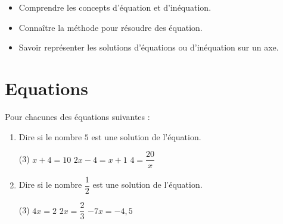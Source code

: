 \documentclass[10pt,a4paper]{article}
\begin{document}


\vspace{-0.3cm}

\begin{objectifs}
\begin{itemize}
    \item Comprendre les concepts d'équation et d'inéquation.
    \item Connaître la méthode pour résoudre des équation.
    \item Savoir représenter les solutions d'équations ou d'inéquation sur un axe.
\end{itemize}
\end{objectifs}

\section{Equations}

\begin{exo}[][]
    Pour chacunes des équations suivantes :
    \begin{enumerate}
        \item Dire si le nombre \(5\) est une solution de l'équation.
        \begin{tasks}(3)
            \task \(x+4 = 10\)
            \task  \( 2x-4 = x+1\) 
            \task \(4 =  \dfrac{20}{x}\)
        \end{tasks}
        \item Dire si le nombre \(\dfrac{1}{2}\) est une solution de l'équation.
        \begin{tasks}(3)
        \task \(4x = 2\)
        \task \(2x  = \dfrac{2}{3}\)
        \task \(-7x= -4,5\)
        \end{tasks}
    \end{enumerate}
\end{exo}
\end{document}
